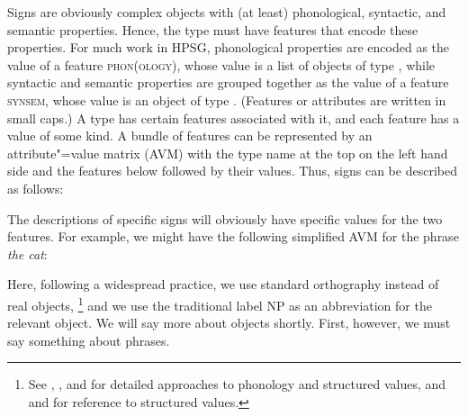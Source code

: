 \documentclass[output=paper
	        ,collection
	        ,collectionchapter
 	        ,biblatex
                ,babelshorthands
                ,newtxmath
                ,draftmode
                ,colorlinks, citecolor=brown
]{langscibook}
\begin{document}
Signs are obviously complex objects with (at least) phonological, syntactic, and semantic
properties. Hence, the type  must have features that encode these properties. For much
work in HPSG, phonological properties are encoded as the value of a feature \textsc{phon(ology)},
whose value is a list of objects of type , while syntactic and semantic properties are
grouped together as the value of a feature \textsc{synsem}, whose value is an object of type
. (Features or attributes are written in small caps.) A type has certain features
associated with it, and each feature has a value of some kind. A bundle of features can be
represented by an attribute"=value matrix (AVM) with the type name at the top on the left hand side
and the features below followed by their values. Thus, signs can be described as follows: 


\ea\label{ex:prop4}
\z

\noindent
The descriptions of specific signs will obviously have specific values for the two features. For
example, we might have the following simplified AVM for the phrase \emph{the cat}: 

\ea\label{ex:prop5}
\z

\noindent
Here, following a widespread practice, we use standard orthography instead of real 
objects,%
\footnote{See \citet{BK94b}, \citet{Hoehle99a-u}, and \citet{Walther99a-u} for detailed approaches to phonology
and structured \phon values, and  and \crossrefchaptert[\page \pageref{coord:page-rnr-I-phi-start}--\pageref{coord:page-rnr-I-phi-end}]{coordination} for reference to structured \phon values.
}
%
and we use the traditional label NP as an abbreviation for the relevant  object. We will say more about  objects shortly. First, however, we must say something about phrases.
\end{document}
